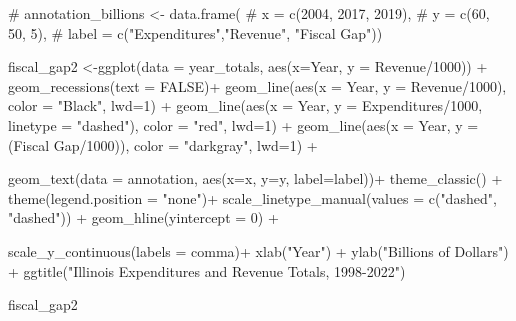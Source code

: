 \documentclass[
  letterpaper,
  DIV=11,
  numbers=noendperiod]{scrreport}
\newenvironment{Shaded}{\begin{snugshade}}{\end{snugshade}}
\newcommand{\AttributeTok}[1]{\textcolor[rgb]{0.40,0.45,0.13}{#1}}
\newcommand{\CommentTok}[1]{\textcolor[rgb]{0.37,0.37,0.37}{#1}}
\newcommand{\ConstantTok}[1]{\textcolor[rgb]{0.56,0.35,0.01}{#1}}
\newcommand{\DecValTok}[1]{\textcolor[rgb]{0.68,0.00,0.00}{#1}}
\newcommand{\FunctionTok}[1]{\textcolor[rgb]{0.28,0.35,0.67}{#1}}
\newcommand{\NormalTok}[1]{\textcolor[rgb]{0.00,0.23,0.31}{#1}}
\newcommand{\OtherTok}[1]{\textcolor[rgb]{0.00,0.23,0.31}{#1}}
\newcommand{\SpecialCharTok}[1]{\textcolor[rgb]{0.37,0.37,0.37}{#1}}
\newcommand{\StringTok}[1]{\textcolor[rgb]{0.13,0.47,0.30}{#1}}
\begin{document}
\begin{Shaded}
\begin{Highlighting}[]
\CommentTok{\# annotation\_billions \textless{}{-} data.frame(}
\CommentTok{\#   x = c(2004, 2017, 2019),}
\CommentTok{\#   y = c(60, 50, 5),  }
\CommentTok{\#   label = c("Expenditures","Revenue", "Fiscal Gap"))}


\NormalTok{fiscal\_gap2 }\OtherTok{\textless{}{-}}\FunctionTok{ggplot}\NormalTok{(}\AttributeTok{data =}\NormalTok{ year\_totals, }\FunctionTok{aes}\NormalTok{(}\AttributeTok{x=}\NormalTok{Year, }\AttributeTok{y =}\NormalTok{ Revenue}\SpecialCharTok{/}\DecValTok{1000}\NormalTok{)) }\SpecialCharTok{+}
  \FunctionTok{geom\_recessions}\NormalTok{(}\AttributeTok{text =} \ConstantTok{FALSE}\NormalTok{)}\SpecialCharTok{+}
  \FunctionTok{geom\_line}\NormalTok{(}\FunctionTok{aes}\NormalTok{(}\AttributeTok{x =}\NormalTok{ Year, }\AttributeTok{y =}\NormalTok{ Revenue}\SpecialCharTok{/}\DecValTok{1000}\NormalTok{), }\AttributeTok{color =} \StringTok{"Black"}\NormalTok{, }\AttributeTok{lwd=}\DecValTok{1}\NormalTok{) }\SpecialCharTok{+}
  \FunctionTok{geom\_line}\NormalTok{(}\FunctionTok{aes}\NormalTok{(}\AttributeTok{x =}\NormalTok{ Year, }\AttributeTok{y =}\NormalTok{ Expenditures}\SpecialCharTok{/}\DecValTok{1000}\NormalTok{, }\AttributeTok{linetype =} \StringTok{"dashed"}\NormalTok{), }\AttributeTok{color =} \StringTok{"red"}\NormalTok{, }\AttributeTok{lwd=}\DecValTok{1}\NormalTok{) }\SpecialCharTok{+}
  \FunctionTok{geom\_line}\NormalTok{(}\FunctionTok{aes}\NormalTok{(}\AttributeTok{x =}\NormalTok{ Year, }\AttributeTok{y =}\NormalTok{ (}\StringTok{\textasciigrave{}}\AttributeTok{Fiscal Gap}\StringTok{\textasciigrave{}}\SpecialCharTok{/}\DecValTok{1000}\NormalTok{)), }\AttributeTok{color =} \StringTok{"darkgray"}\NormalTok{, }\AttributeTok{lwd=}\DecValTok{1}\NormalTok{) }\SpecialCharTok{+}
  
  \FunctionTok{geom\_text}\NormalTok{(}\AttributeTok{data =}\NormalTok{ annotation, }\FunctionTok{aes}\NormalTok{(}\AttributeTok{x=}\NormalTok{x, }\AttributeTok{y=}\NormalTok{y, }\AttributeTok{label=}\NormalTok{label))}\SpecialCharTok{+}
    \FunctionTok{theme\_classic}\NormalTok{() }\SpecialCharTok{+}
  \FunctionTok{theme}\NormalTok{(}\AttributeTok{legend.position =} \StringTok{"none"}\NormalTok{)}\SpecialCharTok{+}
    \FunctionTok{scale\_linetype\_manual}\NormalTok{(}\AttributeTok{values =} \FunctionTok{c}\NormalTok{(}\StringTok{"dashed"}\NormalTok{, }\StringTok{"dashed"}\NormalTok{)) }\SpecialCharTok{+}
  \FunctionTok{geom\_hline}\NormalTok{(}\AttributeTok{yintercept =} \DecValTok{0}\NormalTok{) }\SpecialCharTok{+}

  \FunctionTok{scale\_y\_continuous}\NormalTok{(}\AttributeTok{labels =}\NormalTok{ comma)}\SpecialCharTok{+}
  \FunctionTok{xlab}\NormalTok{(}\StringTok{"Year"}\NormalTok{) }\SpecialCharTok{+} 
  \FunctionTok{ylab}\NormalTok{(}\StringTok{"Billions of Dollars"}\NormalTok{)  }\SpecialCharTok{+}
  \FunctionTok{ggtitle}\NormalTok{(}\StringTok{"Illinois Expenditures and Revenue Totals, 1998{-}2022"}\NormalTok{)}


\NormalTok{fiscal\_gap2}
\end{Highlighting}
\end{Shaded}
\end{document}
